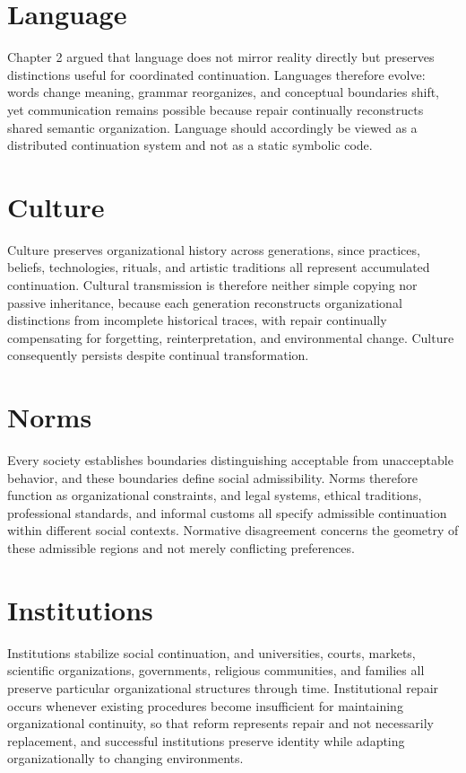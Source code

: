 \documentclass[11pt,oneside]{book}
\numberwithin{equation}{chapter}
\theoremstyle{definition}
\theoremstyle{plain}
\begin{document}
\section{Language}

Chapter 2 argued that language does not mirror reality directly but preserves distinctions useful for coordinated continuation. Languages therefore evolve: words change meaning, grammar reorganizes, and conceptual boundaries shift, yet communication remains possible because repair continually reconstructs shared semantic organization. Language should accordingly be viewed as a distributed continuation system and not as a static symbolic code.

\section{Culture}

Culture preserves organizational history across generations, since practices, beliefs, technologies, rituals, and artistic traditions all represent accumulated continuation. Cultural transmission is therefore neither simple copying nor passive inheritance, because each generation reconstructs organizational distinctions from incomplete historical traces, with repair continually compensating for forgetting, reinterpretation, and environmental change. Culture consequently persists despite continual transformation.

\section{Norms}

Every society establishes boundaries distinguishing acceptable from unacceptable behavior, and these boundaries define social admissibility. Norms therefore function as organizational constraints, and legal systems, ethical traditions, professional standards, and informal customs all specify admissible continuation within different social contexts. Normative disagreement concerns the geometry of these admissible regions and not merely conflicting preferences.

\section{Institutions}

Institutions stabilize social continuation, and universities, courts, markets, scientific organizations, governments, religious communities, and families all preserve particular organizational structures through time. Institutional repair occurs whenever existing procedures become insufficient for maintaining organizational continuity, so that reform represents repair and not necessarily replacement, and successful institutions preserve identity while adapting organizationally to changing environments.
\end{document}
